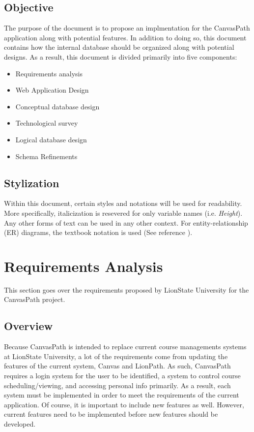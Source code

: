 \documentclass{article}
\begin{document}
  \subsection{Objective}\label{sec:Introduction:Objective}
    The purpose of the document is to propose an implmentation for the CanvasPath application along with potential features.  In addition to doing so, this document contains how the internal database should be organized along with potential designs.  As a result, this document is divided primarily into five components:
    \begin{itemize}
      \item Requirements analysis
      \item Web Application Design
      \item Conceptual database design
      \item Technological survey
      \item Logical database design
      \item Schema Refinements
    \end{itemize}

  \medskip

  \subsection{Stylization}\label{sec:Introduction:Stylization}
    Within this document, certain styles and notations will be used for readability.  More specifically, italicization is resevered for only variable names (i.e. \textit{Height}).  Any other forms of text can be used in any other context.  For entity-relationship (ER) diagrams, the textbook notation is used (See reference \cite{textbook}).

  \newpage


  \section{Requirements Analysis}\label{sec:Requirements}
    This section goes over the requirements proposed by LionState University for the CanvasPath project.

  \subsection{Overview}\label{sec:Requrements:Overview}
    Because CanvasPath is intended to replace current course managements systems at LionState University, a lot of the requirements come from updating the features of the current system, Canvas and LionPath.  As such, CanvasPath requires a login system for the user to be identified, a system to control course scheduling/viewing, and accessing personal info primarily.  As a result, each system must be implemented in order to meet the requirements of the current application.  Of course, it is important to include new features as well.  However, current features need to be implemented before new features should be developed.
\end{document}
